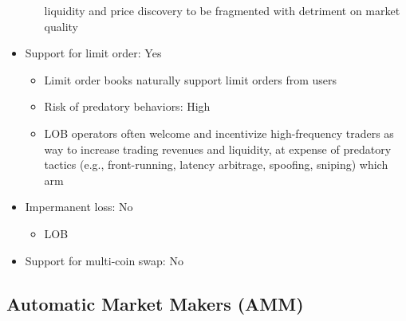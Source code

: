 \documentclass[11pt, reqno]{amsart}
\theoremstyle{definition}
\theoremstyle{remark}
\begin{document}
\begin{itemize}
\begin{itemize}
                liquidity and price discovery to be fragmented with detriment
                on market quality
	      \end{itemize}
	\item Support for limit order: Yes
	      \begin{itemize}
		      \item Limit order books naturally support limit orders from users
		      \item Risk of predatory behaviors: High
		      \item LOB operators often welcome and incentivize high-frequency traders as way
		            to increase trading revenues and liquidity, at expense of predatory tactics
		            (e.g., front-running, latency arbitrage, spoofing, sniping) which arm
	      \end{itemize}
	\item Impermanent loss: No
	      \begin{itemize}
		      \item LOB
	      \end{itemize}
	\item Support for multi-coin swap: No
\end{itemize}

\subsection{Automatic Market Makers (AMM)}
\end{document}
